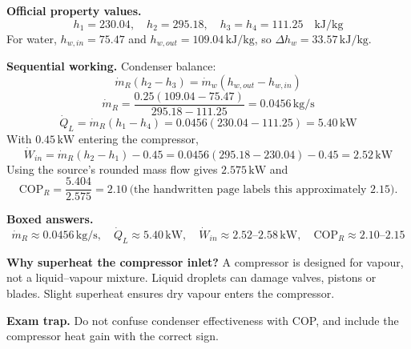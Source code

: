 
\textbf{Official property values.}
\[
h_1=230.04,\quad h_2=295.18,\quad h_3=h_4=111.25\quad \mathrm{kJ/kg}
\]
For water, $h_{w,in}=75.47$ and $h_{w,out}=109.04\,\mathrm{kJ/kg}$, so $\Delta h_w=33.57\,\mathrm{kJ/kg}$.

\textbf{Sequential working.}
Condenser balance:
\[
\dot m_R(h_2-h_3)=\dot m_w(h_{w,out}-h_{w,in})
\]
\[
\dot m_R=\frac{0.25(109.04-75.47)}{295.18-111.25}=0.0456\,\mathrm{kg/s}
\]
\[
\dot Q_L=\dot m_R(h_1-h_4)=0.0456(230.04-111.25)=5.40\,\mathrm{kW}
\]
With $0.45\,\mathrm{kW}$ entering the compressor,
\[
\dot W_{in}=\dot m_R(h_2-h_1)-0.45
=0.0456(295.18-230.04)-0.45=2.52\,\mathrm{kW}
\]
Using the source's rounded mass flow gives $2.575\,\mathrm{kW}$ and
\[
\mathrm{COP}_R=\frac{5.404}{2.575}=2.10\ \text{(the handwritten page labels this approximately 2.15).}
\]

\textbf{Boxed answers.}
\[
\boxed{\dot m_R\approx0.0456\,\mathrm{kg/s},\quad \dot Q_L\approx5.40\,\mathrm{kW},\quad \dot W_{in}\approx2.52\text{--}2.58\,\mathrm{kW},\quad \mathrm{COP}_R\approx2.10\text{--}2.15}
\]

\textbf{Why superheat the compressor inlet?} A compressor is designed for vapour, not a liquid--vapour mixture. Liquid droplets can damage valves, pistons or blades. Slight superheat ensures dry vapour enters the compressor.

\textbf{Exam trap.} Do not confuse condenser effectiveness with COP, and include the compressor heat gain with the correct sign.
